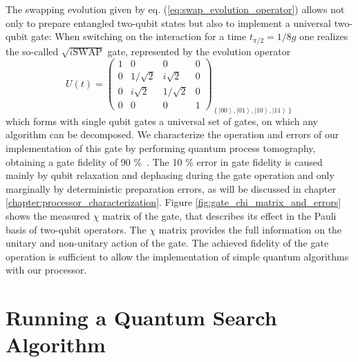The swapping evolution given by eq. (\ref{eq:swap_evolution_operator})
allows not only to prepare entangled two-qubit states but also to
implement a universal two-qubit gate:
When switching on the interaction for a time $t_{\pi/2}=1/8g$ one
realizes the so-called $\sqrt{i\mathrm{SWAP}}$ gate, represented
by the evolution operator
%
\begin{equation}
U(t)=\left(\begin{array}{cccc}
1 & 0 & 0 & 0\\
0 & 1/\sqrt{2} & i\sqrt{2} & 0\\
0 & i\sqrt{2} & 1/\sqrt{2} & 0\\
0 & 0 & 0 & 1\end{array}\right)_{\left\{ \left|00\right\rangle ,\left|01\right\rangle ,\left|10\right\rangle ,\left|11\right\rangle \right\} } \label{eq:sqrt_iswap_gate}\end{equation}
%
which forms with single qubit gates a universal set
of gates, on which any algorithm can be decomposed. We characterize
the operation and errors of our implementation of this gate by performing
quantum process tomography, obtaining a gate fidelity of 90 \%\ .
The 10 \% error in gate fidelity is caused mainly by qubit relaxation
and dephasing during the gate operation and only marginally by deterministic
preparation errors, as will be discussed in chapter \ref{chapter:processor_characterization}. Figure \ref{fig:gate_chi_matrix_and_errors}
shows the measured $\chi$ matrix of the gate, that describes its
effect in the Pauli basis of two-qubit operators. The $\chi$ matrix
provides the full information on the unitary and non-unitary action
of the gate. The achieved fidelity of the gate operation is sufficient
to allow the implementation of simple quantum algorithms with our
processor.


\section{Running a Quantum Search Algorithm}


